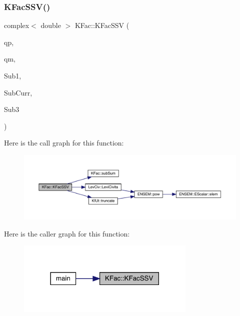 \subsubsection{\texorpdfstring{KFacSSV()}{KFacSSV()}}
{\footnotesize\ttfamily complex$<$ double $>$ K\+Fac\+::\+K\+Fac\+S\+SV (\begin{DoxyParamCaption}\item[{Eigen\+::\+Vector\+Xd \&}]{qp,  }\item[{Eigen\+::\+Vector\+Xd \&}]{qm,  }\item[{map$<$ int, Eigen\+::\+Matrix\+Xcd $>$ \&}]{Sub1,  }\item[{map$<$ int, Eigen\+::\+Matrix\+Xcd $>$ \&}]{Sub\+Curr,  }\item[{map$<$ int, Eigen\+::\+Matrix\+Xcd $>$ \&}]{Sub3 }\end{DoxyParamCaption})}

Here is the call graph for this function\+:\nopagebreak
\begin{figure}[H]
\begin{center}
\leavevmode
\includegraphics[width=350pt]{d2/d89/namespaceKFac_a4cb65a4089c62e25d5511e2711fed59d_cgraph}
\end{center}
\end{figure}
Here is the caller graph for this function\+:\nopagebreak
\begin{figure}[H]
\begin{center}
\leavevmode
\includegraphics[width=242pt]{d2/d89/namespaceKFac_a4cb65a4089c62e25d5511e2711fed59d_icgraph}
\end{center}
\end{figure}
\mbox{\label{namespaceKFac_a02b5c2876eea15ce628ac7cc58a4b746}} 
